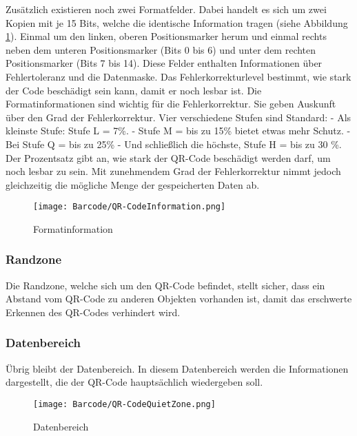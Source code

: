 {Zusätzlich existieren noch zwei Formatfelder. Dabei handelt es sich um 
    zwei Kopien mit je 15 Bits, welche die identische Information tragen (siehe Abbildung \ref{Fachinformation }). 
    Einmal um den linken, oberen Positionsmarker herum und einmal rechts neben dem unteren Positionsmarker (Bits 0 bis 6) und unter dem rechten Positionsmarker (Bits 7 bis 14). Diese Felder enthalten Informationen über Fehlertoleranz und die Datenmaske. Das Fehlerkorrekturlevel bestimmt, wie stark der Code beschädigt sein kann, damit er noch lesbar ist.
    Die Formatinformationen sind wichtig für die Fehlerkorrektur. Sie geben Auskunft über den Grad der Fehlerkorrektur. Vier verschiedene Stufen sind Standard:
    -	Als kleinste Stufe: Stufe L = 7\%.
    -	Stufe M = bis zu 15\% bietet etwas mehr Schutz.
    -	Bei Stufe Q = bis zu 25\%
    -	Und schließlich die höchste, Stufe H = bis zu 30 \%.
    Der Prozentsatz gibt an, wie stark der QR-Code beschädigt werden darf, um noch lesbar zu sein. Mit zunehmendem Grad der Fehlerkorrektur nimmt jedoch gleichzeitig die mögliche Menge der gespeicherten Daten ab.  \cite{Mishra:2017}
}

\begin{figure}
    \centering
    \texttt{[image: Barcode/QR-CodeInformation.png]}
    \caption{Formatinformation }
    \label{Fachinformation }
\end{figure}


\subsubsection{Randzone }

{Die Randzone, welche sich um den QR-Code befindet, stellt sicher, dass ein Abstand vom QR-Code zu anderen Objekten vorhanden ist, damit das erschwerte Erkennen des QR-Codes verhindert wird.  \cite{Mishra:2017}
}

\subsubsection{Datenbereich}

{Übrig bleibt der Datenbereich. 
    In diesem Datenbereich werden die Informationen dargestellt, die der QR-Code hauptsächlich wiedergeben soll.  \cite{Mishra:2017}
} 

\begin{figure}
    \centering
    \texttt{[image: Barcode/QR-CodeQuietZone.png]}
    \caption{Datenbereich  }
    \label{Datenbereich}
\end{figure}



